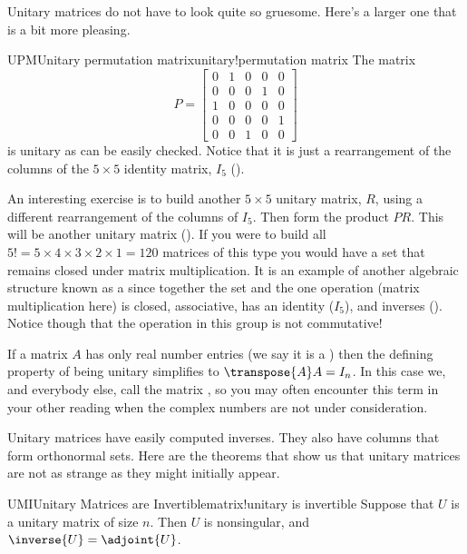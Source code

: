 %
%
%
Unitary matrices do not have to look quite so gruesome.  Here's a larger one that is a bit more pleasing.
%
\begin{example}{UPM}{Unitary permutation matrix}{unitary!permutation matrix}
The matrix
%
\begin{equation*}
P=
\begin{bmatrix}
0&1&0&0&0\\
0&0&0&1&0\\
1&0&0&0&0\\
0&0&0&0&1\\
0&0&1&0&0
\end{bmatrix}
\end{equation*}
%
is unitary as can be easily checked.  Notice that it is just a rearrangement of the columns of the $5\times 5$ identity matrix, $I_5$ ().\par
%
An interesting exercise is to build another $5\times 5$ unitary matrix, $R$, using a different rearrangement of the columns of $I_5$.  Then form the product $PR$.  This will be another unitary matrix ().  If you were to build all $5!=5\times 4\times 3\times 2\times 1=120$ matrices of this type you would have a set that remains closed under matrix multiplication.  It is an example of another algebraic structure known as a  since together the set and the one operation (matrix multiplication here) is closed, associative, has an identity ($I_5$), and inverses ().  Notice though that the operation in this group is not commutative!
%
\end{example}
%
If a matrix $A$ has only real number entries (we say it is a ) then the defining property of being unitary simplifies to $\transpose{A}A=I_n$.  In this case we, and everybody else, call the matrix , so you may often encounter this term in your other reading when the complex numbers are not under consideration.\par
%
Unitary matrices have easily computed inverses.  They also have columns that form orthonormal sets.  Here are the theorems that show us that unitary matrices are not as strange as they might initially appear.
%
\begin{theorem}{UMI}{Unitary Matrices are Invertible}{matrix!unitary is invertible}
Suppose that $U$ is a unitary matrix of size $n$.  Then $U$ is nonsingular, and $\inverse{U}=\adjoint{U}$.
\end{theorem}
